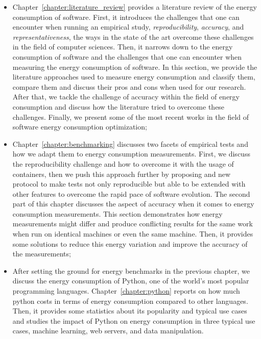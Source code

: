 \begin{itemize}
    \item Chapter~\ref{chapter:literature_review} provides a literature review of the energy consumption of software.
          First, it introduces the challenges that one can encounter when running an empirical study, \emph{reproducibility}, \emph{accuracy}, and \emph{representativeness}, the ways in the state of the art overcome these challenges in the field of computer sciences.
          Then, it narrows down to the energy consumption of software and the challenges that one can encounter when measuring the energy consumption of software.
          In this section, we provide the literature approaches used to measure energy consumption and classify them, compare them and discuss their pros and cons when used for our research. After that, we tackle the challenge of accuracy within the field of energy consumption and discuss how the literature tried to overcome these challenges. Finally, we  present some of the most recent works in the field of software energy consumption optimization;
    \item Chapter~\ref{chapter:benchmarking} discusses two facets of empirical tests and how we adapt them to energy consumption measurements.
          First, we discuss the reproducibility challenge and how to overcome it with the usage of containers, then we push this approach further by proposing and new protocol to make tests not only reproducible but able to be extended with other features to overcome the rapid pace of software evolution.
          The second part of this chapter discusses the aspect of accuracy when it comes to energy consumption measurements.
          This section demonstrates how energy measurements might differ and produce conflicting results for the same work when run on identical machines or even the same machine.
          Then, it provides some solutions to reduce this energy variation and improve the accuracy of the measurements;
    \item After setting the ground for energy benchmarks in the previous chapter, we discuss the energy consumption of Python, one of the world's most popular programming languages.
          Chapter~\ref{chapter:python} reports on how much python costs in terms of energy consumption compared to other languages.
          Then, it provides some statistics about its popularity and typical use cases and studies the impact of Python on energy consumption in three typical use cases, machine learning, web servers, and data manipulation.

\end{itemize}
